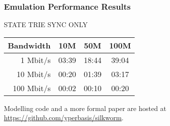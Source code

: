 \documentclass{beamer}
\begin{document}
\begin{frame}
  \frametitle{Emulation Performance Results}

  STATE TRIE SYNC ONLY
  \bigskip

    \begin{tabular}{ r | c c c }
        Bandwidth & 10M & 50M & 100M \\
        \hline
          1 Mbit/s & 03:39 & 18:44 & 39:04 \\
         10 Mbit/s & 00:20 & 01:39 & 03:17 \\
        100 Mbit/s & 00:02 & 00:10 & 00:20 \\
    \end{tabular}

    \bigskip
  Modelling code and a more formal paper are hosted at
  \href{https://github.com/yperbasis/silkworm/}{https://github.com/yperbasis/silkworm}.


\end{frame}
\end{document}
